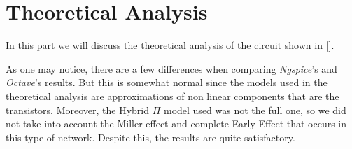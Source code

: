 \clearpage

\section{Theoretical Analysis}
\label{sec:analysis}

In this part we will discuss the theoretical analysis of the circuit shown in \ref{}.

%
%  
%  

%      


As one may notice, there are a few differences when comparing \textit{Ngspice}'s and \textit{Octave}'s results.
But this is somewhat normal since the models used in the theoretical analysis are approximations of non linear components that are the transistors.
Moreover, the Hybrid $\Pi$ model used was not the full one, so we did not take into account the Miller effect and complete Early Effect
that occurs in this type of network. Despite this, the results are quite satisfactory.

